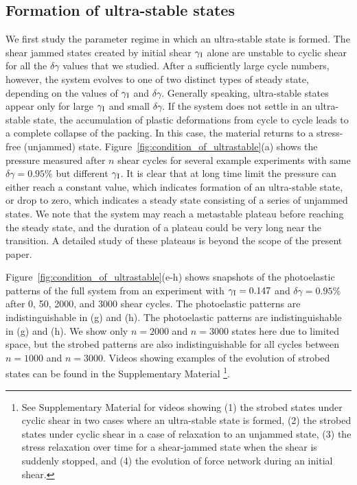 \documentclass[twocolumn,showkeys,superscriptaddress,preprintnumbers,amsmath,amssymb,showpacs,prx,longbibliography]{revtex4-2}
\begin{document}
\begin{CJK*}{UTF8}{gbsn}
\subsection{Formation of ultra-stable states}


We first study the parameter regime in which an ultra-stable state is formed.  The shear jammed states created by initial shear $\gamma_{\rm I}$ alone are unstable to cyclic shear for all the $\delta\gamma$ values that we studied. After a sufficiently large cycle numbers, however, the system evolves to one of two distinct types of steady state, depending on the values of $\gamma_{\rm I}$ and $\delta\gamma$. Generally speaking, ultra-stable states appear only for large $\gamma_{\rm I}$ and small $\delta\gamma$. If the system does not settle in an ultra-stable state, the accumulation of plastic deformations from cycle to cycle leads to a complete collapse of the packing. In this case, the material returns to a stress-free (unjammed) state. Figure~\ref{fig:condition_of_ultrastable}(a) shows the pressure measured after $n$ shear cycles for several example experiments with same $\delta\gamma=0.95\%$ but different $\gamma_{\rm I}$. It is clear that at long time limit the pressure can either reach a constant value, which indicates formation of an ultra-stable state, or drop to zero, which indicates a steady state consisting of a series of unjammed states. We note that the system may reach a metastable plateau before reaching the steady state, and the duration of a plateau could be very long near the transition. A detailed study of these plateaus is beyond the scope of the present paper.

Figure~\ref{fig:condition_of_ultrastable}(e-h) shows snapshots of the photoelastic patterns of the full system from an experiment with $\gamma_{\rm I}=0.147$ and $\delta\gamma = 0.95\%$ after 0, 50, 2000, and 3000 shear cycles. The photoelastic patterns are indistinguishable in (g) and (h).
{\color{black} 
The photoelastic patterns are indistinguishable in (g) and (h). We show only $n=2000$ and $n=3000$ states here due to limited space, but the strobed patterns are also indistinguishable for all cycles between $n=1000$ and $n = 3000$.}
Videos showing examples of the evolution of strobed states can be found in the Supplementary Material \footnote{See Supplementary Material for videos showing (1) the strobed states under cyclic shear in two cases where an ultra-stable state is formed, (2) the strobed states under cyclic shear in a case of relaxation to an unjammed state, (3) the stress relaxation over time for a shear-jammed state when the shear is suddenly stopped, 
{\color{black} and (4) the evolution of force network during an initial shear.}}.


\end{CJK*}
\end{document}

